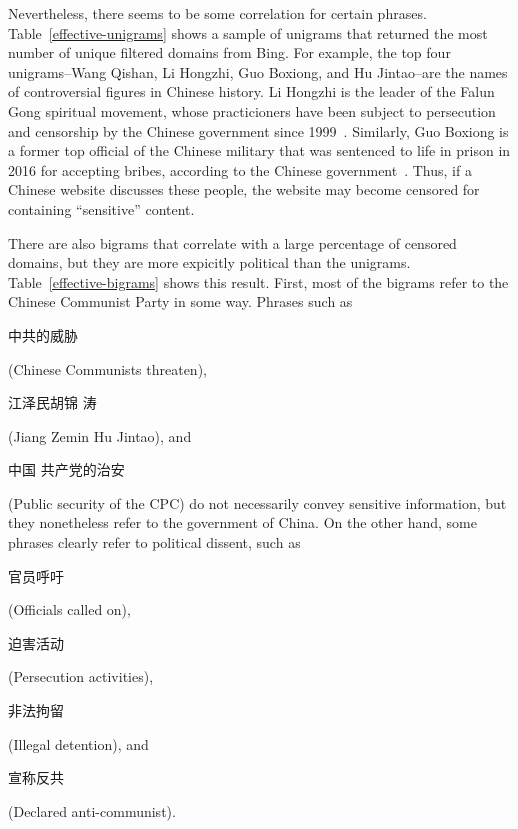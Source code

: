 Nevertheless, there seems to be some correlation for certain
phrases. Table~\ref{effective-unigrams} shows a sample of unigrams
that returned the most number of unique filtered domains from
Bing. For example, the top four unigrams--Wang Qishan, Li Hongzhi, Guo
Boxiong, and Hu Jintao--are the names of controversial figures in
Chinese history. Li Hongzhi is the leader of the Falun Gong spiritual
movement, whose practicioners have been subject to persecution and
censorship by the Chinese government since
1999~\cite{freedomhouse:falun}. Similarly, Guo Boxiong is a former top
official of the Chinese military that was sentenced to life in
prison in 2016 for accepting bribes, according to the Chinese
government~\cite{guardian:guo}. Thus, if a Chinese website discusses
these people, the website may become censored for containing
``sensitive'' content.

There are also bigrams that correlate with a large percentage of
censored domains, but they are more expicitly political than the
unigrams. Table~\ref{effective-bigrams} shows this result. First, most
of the bigrams refer to the Chinese Communist Party in some
way. Phrases such as \begin{CJK*}{UTF8}{gbsn}中共的威胁\end{CJK*}
(Chinese Communists threaten), \begin{CJK*}{UTF8}{gbsn}江泽民胡锦
涛\end{CJK*} (Jiang Zemin Hu Jintao), and \begin{CJK*}{UTF8}{gbsn}中国
共产党的治安\end{CJK*} (Public security of the CPC) do not necessarily
convey sensitive information, but they nonetheless refer to the
government of China. On the other hand, some phrases clearly refer to
political dissent, such as \begin{CJK*}{UTF8}{gbsn}官员呼吁\end{CJK*}
(Officials called on), \begin{CJK*}{UTF8}{gbsn}迫害活动\end{CJK*}
(Persecution activities), \begin{CJK*}{UTF8}{gbsn}非法拘留\end{CJK*}
(Illegal detention), and \begin{CJK*}{UTF8}{gbsn}宣称反共\end{CJK*}
(Declared anti-communist).

